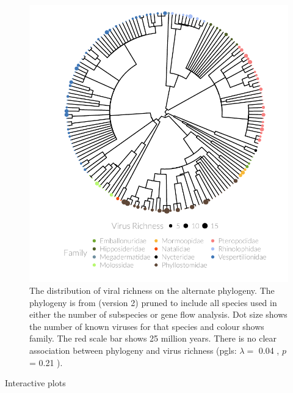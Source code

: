 \begin{knitrout}\footnotesize
{}\color{fgcolor}\begin{figure}[t]

{\centering \includegraphics[width=1\textwidth,trim = 0cm 0cm 0cm 0cm]{figure/A-treePlot2-1} 

}

\caption[Pruned alternative phylogeny with dot size showing number of pathogens and colour showing family.]{
The distribution of viral richness on the alternate phylogeny.
The phylogeny is from \textcite{jones2005bats} (version 2) pruned to include all species used in either the number of subspecies or gene flow analysis.
Dot size shows the number of known viruses for that species and colour shows family.
The red scale bar shows 25 million years. %
There is no clear association between phylogeny and virus richness (pgls: $\lambda = $ 0.04 , $p$ =  0.21 ).}\label{fig:treePlot2}
\end{figure}


\end{knitrout}






Interactive plots







